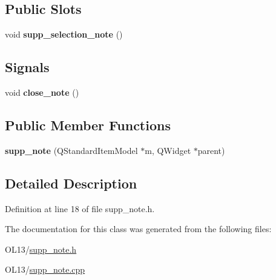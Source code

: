 \subsection*{Public Slots}
\begin{DoxyCompactItemize}
\item 
\mbox{\label{classsupp__note_a5dbf6d3af5c94d71f42eeb2cf626c9d3}} 
void {\bfseries supp\+\_\+selection\+\_\+note} ()
\end{DoxyCompactItemize}
\subsection*{Signals}
\begin{DoxyCompactItemize}
\item 
\mbox{\label{classsupp__note_a0a45d0adbe61d17cb5d088103955da7c}} 
void {\bfseries close\+\_\+note} ()
\end{DoxyCompactItemize}
\subsection*{Public Member Functions}
\begin{DoxyCompactItemize}
\item 
\mbox{\label{classsupp__note_a0a8f0c351866f8026cabfd981b919889}} 
{\bfseries supp\+\_\+note} (Q\+Standard\+Item\+Model $\ast$m, Q\+Widget $\ast$parent)
\end{DoxyCompactItemize}


\subsection{Detailed Description}


Definition at line 18 of file supp\+\_\+note.\+h.



The documentation for this class was generated from the following files\+:\begin{DoxyCompactItemize}
\item 
O\+L13/\hyperlink{supp__note_8h}{supp\+\_\+note.\+h}\item 
O\+L13/\hyperlink{supp__note_8cpp}{supp\+\_\+note.\+cpp}\end{DoxyCompactItemize}
